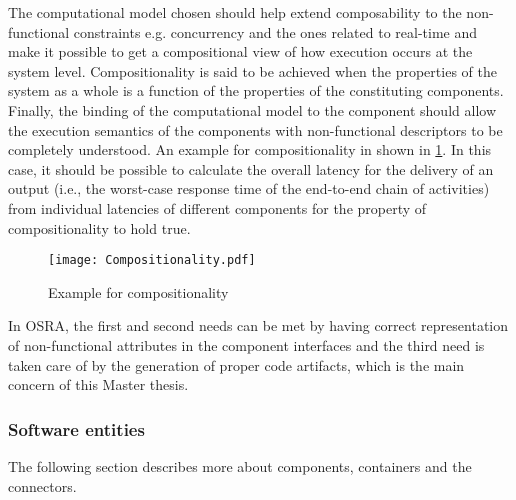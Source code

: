 \begin{description}
The computational model chosen should help extend composability to the non-functional constraints e.g. concurrency and the ones related to real-time and make it possible to get a compositional view of how execution occurs at the system level. Compositionality is said to be achieved when the properties of the system as a whole is a function of the properties of the constituting components. Finally, the binding of the computational model to the component should allow the execution semantics of the components with non-functional descriptors to be completely understood. An example for compositionality in shown in \cref{fig: Compositionality}. In this case, it should be possible to calculate the overall latency for the delivery of an output (i.e., the worst-case response time of the end-to-end chain of activities) from individual latencies of different components for the property of compositionality to hold true.

\begin{figure}[h]
	\centering
	\texttt{[image: Compositionality.pdf]}
	\caption{Example for compositionality}
	\label{fig: Compositionality}
\end{figure} 

In OSRA, the first and second needs can be met by having correct representation of non-functional attributes in the component interfaces and the third need is taken care of by the generation of proper code artifacts, which is the main concern of this Master thesis.     
\end{description}

\subsubsection{\textbf{Software entities}}
\label {section: Software entities}
The following section describes more about components, containers and the connectors.

